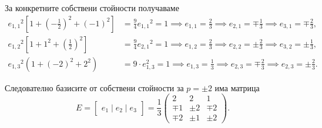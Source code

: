 \documentclass[numbers=endperiod, DIV=15, bibliography=totocnumbered]{scrartcl}
\begin{document}
\begin{solution}
  За конкретните собствени стойности получаваме
  \begin{align*}
    {e_{1,1}}^2 \left[1 + {\left( - \frac 1 2 \right)}^2 + {(-1)}^2 \right] &= \frac 9 4 {e_{1,1}}^2 = 1 \implies e_{1,1} = \frac 2 3 \implies e_{2,1} = \mp \frac 1 3 \implies e_{3,1} = \mp \frac 2 3,
    \\
    {e_{1,2}}^2 \left[1 + 1^2 + {\left( \frac 1 2 \right)}^2 \right] &= \frac 9 4 {e_{2,1}}^2 = 1 \implies e_{1,2} = \frac 2 3 \implies e_{2,2} = \pm \frac 2 3 \implies e_{3,2} = \pm \frac 1 3,
    \\
    {e_{1,3}}^2 \left(1 + {(-2)}^2 + 2^2 \right) &= 9 \cdot {e_{1,3}^2} = 1 \implies e_{1,3} = \frac 1 3 \implies e_{2,3} = \mp \frac 2 3 \implies e_{2,3} = \pm \frac 2 3.
  \end{align*}

  Следователно базисите от собствени стойности за $p = \pm 2$ има матрица
  \begin{displaymath}
    E = \begin{bmatrix} e_1 \mid e_2 \mid e_3 \end{bmatrix} = \frac 1 3 \begin{pmatrix}
          2 &     2 &     1 \\
      \mp 1 & \pm 2 & \mp 2 \\
      \mp 2 & \pm 1 & \pm 2
    \end{pmatrix}.
  \end{displaymath}


\end{solution}
\end{document}
